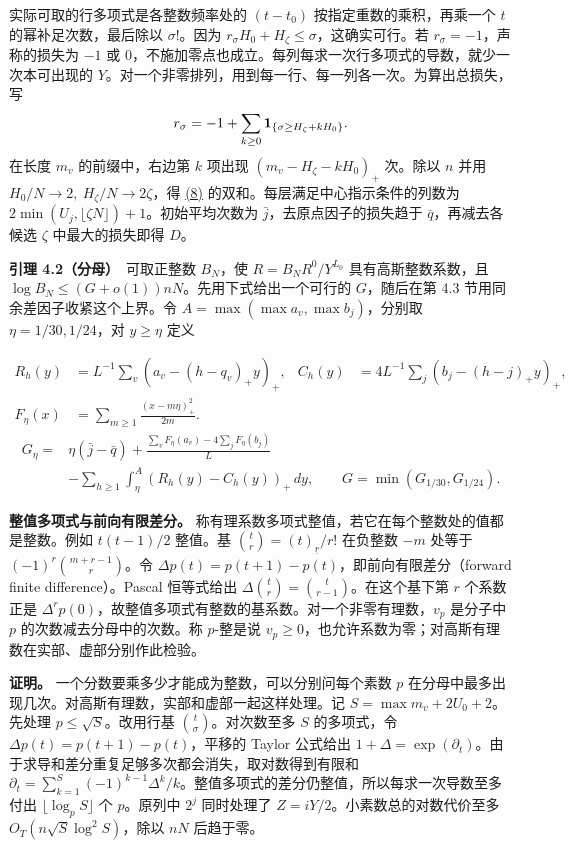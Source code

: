 \documentclass[11pt,a4paper]{article}
\begin{document}
实际可取的行多项式是各整数频率处的 \((t-t_0)\) 按指定重数的乘积，再乘一个 \(t\) 的幂补足次数，最后除以 \(\sigma!\)。因为 \(r_\sigma H_0+H_\zeta\le\sigma\)，这确实可行。若 \(r_\sigma=-1\)，声称的损失为 \(-1\) 或 \(0\)，不施加零点也成立。每列每求一次行多项式的导数，就少一次本可出现的 \(Y\)。对一个非零排列，用到每一行、每一列各一次。为算出总损失，写 \[
 r_\sigma=-1+\sum_{k\ge0}{\bf1}_{\{\sigma\ge H_\zeta+kH_0\}}.
\] 在长度 \(m_v\) 的前缀中，右边第 \(k\) 项出现 \((m_v-H_\zeta-kH_0)_+\) 次。除以 \(n\) 并用 \(H_0/N\to2,\ H_\zeta/N\to2\zeta\)，得 \hyperref[eq:8]{(8)} 的双和。每层满足中心指示条件的列数为 \(2\min(U_j,\lfloor\zeta N\rfloor)+1\)。初始平均次数为 \(\bar j\)，去原点因子的损失趋于 \(\bar q\)，再减去各候选 \(\zeta\) 中最大的损失即得 \(D\)。

\textbf{引理 4.2（分母）}　可取正整数 \(B_N\)，使 \(R=B_NR^0/Y^{L_0}\) 具有高斯整数系数，且 \(\log B_N\le (G+o(1))nN\)。先用下式给出一个可行的 \(G\)，随后在第 4.3 节用同余差因子收紧这个上界。令 \(A=\max(\max a_v,\max b_j)\)，分别取 \(\eta=1/30,1/24\)，对 \(y\ge\eta\) 定义

\[
 \begin{aligned}
 R_h(y)&=L^{-1}\sum_v(a_v-(h-q_v)_+y)_+,&
 C_h(y)&=4L^{-1}\sum_j(b_j-(h-j)_+y)_+,\\
 F_\eta(x)&=\sum_{m\ge1}\frac{(x-m\eta)_+^2}{2m}.&&
 \end{aligned}
\] \[
 \begin{aligned}
 G_\eta={}&\eta(\bar j-\bar q)+
 \frac{\sum_v F_\eta(a_v)-4\sum_j F_\eta(b_j)}{L}\\
 &-\sum_{h\ge1}\int_\eta^{A}(R_h(y)-C_h(y))_+\,dy,\qquad
 G=\min(G_{1/30},G_{1/24}).
 \end{aligned}\tag{9}\label{eq:9}
\]

\textbf{整值多项式与前向有限差分。} 称有理系数多项式整值，若它在每个整数处的值都是整数。例如 \(t(t-1)/2\) 整值。基 \(\binom tr=(t)_{\underline r}/r!\) 在负整数 \(-m\) 处等于 \((-1)^r\binom{m+r-1}r\)。令 \(\Delta p(t)=p(t+1)-p(t)\)，即前向有限差分（forward finite difference）。Pascal 恒等式给出 \(\Delta\binom tr=\binom t{r-1}\)。在这个基下第 \(r\) 个系数正是 \(\Delta^r p(0)\)，故整值多项式有整数的基系数。对一个非零有理数，\(v_p\) 是分子中 \(p\) 的次数减去分母中的次数。称 \(p\)-整是说 \(v_p\ge0\)，也允许系数为零；对高斯有理数在实部、虚部分别作此检验。

\textbf{证明。} 一个分数要乘多少才能成为整数，可以分别问每个素数 \(p\) 在分母中最多出现几次。对高斯有理数，实部和虚部一起这样处理。记 \(S=\max m_v+2U_0+2\)。先处理 \(p\le\sqrt S\)。改用行基 \(\binom t\sigma\)。对次数至多 \(S\) 的多项式，令 \(\Delta p(t)=p(t+1)-p(t)\)，平移的 Taylor 公式给出 \(1+\Delta=\exp(\partial_t)\)。由于求导和差分重复足够多次都会消失，取对数得到有限和 \(\partial_t=\sum_{k=1}^S(-1)^{k-1}\Delta^k/k\)。整值多项式的差分仍整值，所以每求一次导数至多付出 \(\lfloor\log_p S\rfloor\) 个 \(p\)。原列中 \(2^j\) 同时处理了 \(Z=iY/2\)。小素数总的对数代价至多 \(O_T(n\sqrt S\log^2 S)\)，除以 \(nN\) 后趋于零。
\end{document}
